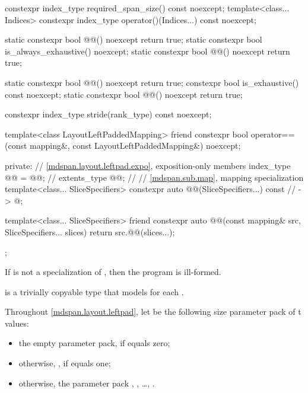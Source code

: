 \begin{codeblock}
{{    constexpr index_type required_span_size() const noexcept;
    template<class... Indices>
      constexpr index_type operator()(Indices...) const noexcept;

    static constexpr bool @@() noexcept { return true; }
    static constexpr bool is_always_exhaustive() noexcept;
    static constexpr bool @@() noexcept { return true; }

    static constexpr bool @@() noexcept { return true; }
    constexpr bool is_exhaustive() const noexcept;
    static constexpr bool @@() noexcept { return true; }

    constexpr index_type stride(rank_type) const noexcept;

    template<class LayoutLeftPaddedMapping>
      friend constexpr bool operator==(const mapping&, const LayoutLeftPaddedMapping&) noexcept;

  private:
    // \ref{mdspan.layout.leftpad.expo}, exposition-only members
    index_type @@ = @@;                           // \expos
    extents_type @@{};                                               // \expos
    // \ref{mdspan.sub.map},  mapping specialization
    template<class... SliceSpecifiers>
      constexpr auto @@(SliceSpecifiers...) const     // \expos
        -> @\seebelow@;

    template<class... SliceSpecifiers>
      friend constexpr auto @@(const mapping& src, SliceSpecifiers... slices) {
      return src.@@(slices...);
    }
  };
}
\end{codeblock}

\pnum
If  is not a specialization of ,
then the program is ill-formed.

\pnum
{} is a trivially copyable type
that models  for each .

\pnum
Throughout \ref{mdspan.layout.leftpad},
let  be the following
size  parameter pack of t values:
\begin{itemize}
\item
the empty parameter pack, if  equals zero;
\item
otherwise, , if  equals one;
\item
otherwise, the parameter pack , , \ldots, .
\end{itemize}

